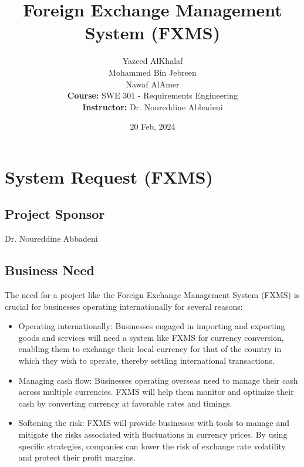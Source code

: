 \documentclass[a4paper]{report}
\title{Foreign Exchange Management System (FXMS)}
\author{
    Yazeed AlKhalaf \\
    Mohammed Bin Jebreen \\
    Nawaf AlAmer \\
    \textbf{Course:} SWE 301 - Requirements Engineering \\
    \textbf{Instructor:} Dr. Noureddine Abbadeni
}
\date{20 Feb, 2024}
\begin{document}
\maketitle

\newpage

\tableofcontents

\chapter{System Request (FXMS)}

\section{Project Sponsor}
Dr. Noureddine Abbadeni

\section{Business Need}
The need for a project like the Foreign Exchange Management System (FXMS) is crucial for businesses operating internationally for several reasons:
\begin{itemize}
    \item Operating internationally: Businesses engaged in importing and exporting goods and services will need a system like FXMS for currency conversion, enabling them to exchange their local currency for that of the country in which they wish to operate, thereby settling international transactions.
    \item Managing cash flow: Businesses operating overseas need to manage their cash across multiple currencies. FXMS will help them monitor and optimize their cash by converting currency at favorable rates and timings.
    \item Softening the risk: FXMS will provide businesses with tools to manage and mitigate the risks associated with fluctuations in currency prices. By using specific strategies, companies can lower the risk of exchange rate volatility and protect their profit margins.
\end{itemize}
\end{document}
